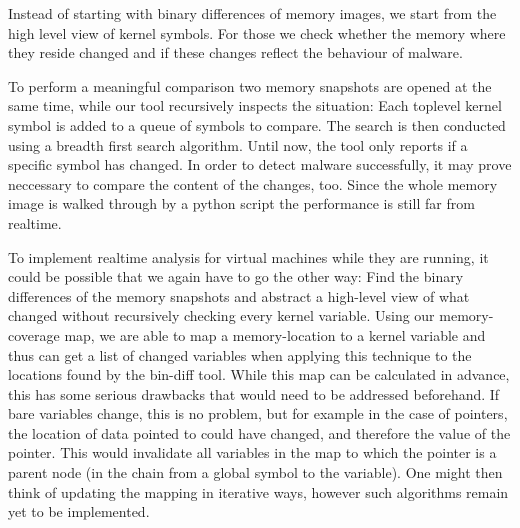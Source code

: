 Instead of starting with binary differences of memory images, we start from the high level view of kernel symbols. 
For those we check whether the memory where they reside changed and if these changes reflect the behaviour of malware.

To perform a meaningful comparison two memory snapshots are opened at the same time, while our tool recursively inspects the situation: Each toplevel kernel symbol is added to a queue of symbols to compare.
The search is then conducted using a breadth first search algorithm.
Until now, the tool only reports if a specific symbol has changed.
In order to detect malware successfully, it may prove neccessary to compare the content of the changes, too.
Since the whole memory image is walked through by a python script the performance is still far from realtime. 

To implement realtime analysis for virtual machines while they are running, it could be possible that we again have to go the other way: 
Find the binary differences of the memory snapshots and abstract a high-level view of what changed without recursively checking every kernel variable.
Using our memory-coverage map, we are able to map a memory-location to a kernel variable and thus can get a list of changed variables when applying this technique to the locations found by the bin-diff tool.
While this map can be calculated in advance, this has some serious drawbacks that would need to be addressed beforehand.
If bare variables change, this is no problem, but for example in the case of pointers, 
the location of data pointed to could have changed, and therefore the value of the pointer.
This would invalidate all variables in the map to which the pointer is a parent node (in the chain from a global symbol to the variable).
One might then think of updating the mapping in iterative ways, however such algorithms remain yet to be implemented.

